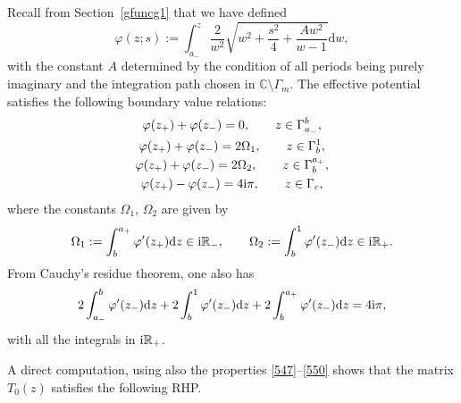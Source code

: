 \documentclass[pdftex]{sigma}
\numberwithin{equation}{section}
\theoremstyle{definition}
\def \d{{\mathrm d}}
\def\be{\begin{equation}}
\def\ee{\end{equation}}
\def\C{{\mathbb C}}
\def\R{{\mathbb R}}
\def\la{\label}
\begin{document}
Recall from Section~\ref{gfuncg1} that we have defined
\[
\varphi(z;s) := \int_{a_-}^z \frac 2 {w^2} \sqrt{w^2 + \frac {s^2}4 + \frac {Aw^2}{w-1}}\d w,
\]
with the constant $A$ determined by the condition of all periods being purely imaginary and the integration path chosen in $\C \setminus \Gamma_m$.
The effective potential satisfies the following boundary value relations:
\begin{gather}
\varphi(z_+)+ \varphi(z_-) = 0, \qquad z\in \Gamma_{a_-}^b,
\la{547}\\
\varphi(z_+)+ \varphi(z_-) = 2\Omega_1, \qquad z\in \Gamma_{b}^1,\\
\varphi(z_+)+ \varphi(z_-)= 2\Omega_2, \qquad z\in \Gamma_{b}^{a_+}, \\
\varphi(z_+)- \varphi(z_-) = 4{\rm i}\pi, \qquad z\in \Gamma_{c}\la{550},
\end{gather}
where the constants $\Omega_1$, $\Omega_2$ are given by
\be
\label{defOmega12}
\Omega_1:= \int_{b}^{a_+} \varphi'(z_+) \d z \in {\rm i}\R_-, \qquad
\Omega_2:= \int_{b}^{1} \varphi'(z_-) \d z \in {\rm i}\R_+.
\ee
From Cauchy's residue theorem, one also has
\[
2\int_{a_-}^{b} \varphi'(z_-)\d z +2\int_{b}^{1} \varphi'(z_-)\d z +2\int_{b}^{a_+} \varphi'(z_-)\d z =4{\rm i}\pi,
\]
with all the integrals in ${\rm i}\R_+$.

A direct computation, using also the properties \eqref{547}--\eqref{550} shows that the matrix $T_0(z)$ satisfies the following RHP.
\end{document}
